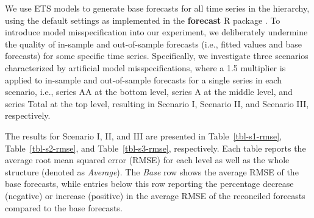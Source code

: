 \documentclass[11pt,a4paper,]{article}
\begin{document}
We use ETS models to generate base forecasts for all time series in the
hierarchy, using the default settings as implemented in the
\textbf{forecast} R package \autocite{Hyndman2023-fc}. To introduce
model misspecification into our experiment, we deliberately undermine
the quality of in-sample and out-of-sample forecasts (i.e., fitted
values and base forecasts) for some specific time series. Specifically,
we investigate three scenarios characterized by artificial model
misspecifications, where a 1.5 multiplier is applied to in-sample and
out-of-sample forecasts for a single series in each scenario, i.e.,
series AA at the bottom level, series A at the middle level, and series
Total at the top level, resulting in Scenario I, Scenario II, and
Scenario III, respectively.

The results for Scenario I, II, and III are presented in
Table~\ref{tbl-s1-rmse}, Table~\ref{tbl-s2-rmse}, and
Table~\ref{tbl-s3-rmse}, respectively. Each table reports the average
root mean squared error (RMSE) for each level as well as the whole
structure (denoted as \emph{Average}). The \emph{Base} row shows the
average RMSE of the base forecasts, while entries below this row
reporting the percentage decrease (negative) or increase (positive) in
the average RMSE of the reconciled forecasts compared to the base
forecasts.
\end{document}
